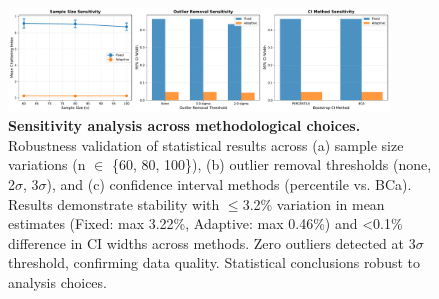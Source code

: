 \begin{figure}[htbp]
\centering
\includegraphics[width=0.9\textwidth]{figures/figure_vi_1_sensitivity_analysis.pdf}
\caption{%
\textbf{Sensitivity analysis across methodological choices.}
Robustness validation of statistical results across
(a) sample size variations (n $\in$ \{60, 80, 100\}),
(b) outlier removal thresholds (none, 2$\sigma$, 3$\sigma$), and
(c) confidence interval methods (percentile vs. BCa).
Results demonstrate stability with $\leq$3.2\% variation in mean estimates
(Fixed: max 3.22\%, Adaptive: max 0.46\%) and <0.1\% difference in CI widths
across methods. Zero outliers detected at 3$\sigma$ threshold, confirming
data quality. Statistical conclusions robust to analysis choices.
}
\label{fig:appendix-sensitivity-analysis}
\end{figure}

%
%
%    
%
%
%
